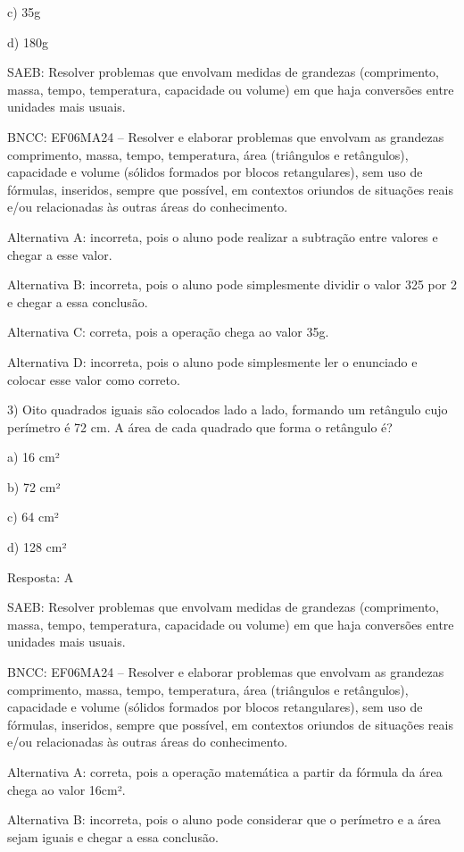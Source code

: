 c) 35g

d) 180g

SAEB: Resolver problemas que envolvam medidas de grandezas (comprimento,
massa, tempo, temperatura, capacidade ou volume) em que haja conversões
entre unidades mais usuais.

BNCC: EF06MA24 -- Resolver e elaborar problemas que envolvam as
grandezas comprimento, massa, tempo, temperatura, área (triângulos e
retângulos), capacidade e volume (sólidos formados por blocos
retangulares), sem uso de fórmulas, inseridos, sempre que possível, em
contextos oriundos de situações reais e/ou relacionadas às outras áreas
do conhecimento.

Alternativa A: incorreta, pois o aluno pode realizar a subtração entre
valores e chegar a esse valor.

Alternativa B: incorreta, pois o aluno pode simplesmente dividir o valor
325 por 2 e chegar a essa conclusão.

Alternativa C: correta, pois a operação chega ao valor 35g.

Alternativa D: incorreta, pois o aluno pode simplesmente ler o enunciado
e colocar esse valor como correto.

3) Oito quadrados iguais são colocados lado a lado, formando um
retângulo cujo perímetro é 72 cm. A área de cada quadrado que forma o
retângulo é?

a) 16 cm²

b) 72 cm²

c) 64 cm²

d) 128 cm²

Resposta: A

SAEB: Resolver problemas que envolvam medidas de grandezas (comprimento,
massa, tempo, temperatura, capacidade ou volume) em que haja conversões
entre unidades mais usuais.

BNCC: EF06MA24 -- Resolver e elaborar problemas que envolvam as
grandezas comprimento, massa, tempo, temperatura, área (triângulos e
retângulos), capacidade e volume (sólidos formados por blocos
retangulares), sem uso de fórmulas, inseridos, sempre que possível, em
contextos oriundos de situações reais e/ou relacionadas às outras áreas
do conhecimento.

Alternativa A: correta, pois a operação matemática a partir da fórmula
da área chega ao valor 16cm².

Alternativa B: incorreta, pois o aluno pode considerar que o perímetro e
a área sejam iguais e chegar a essa conclusão.


